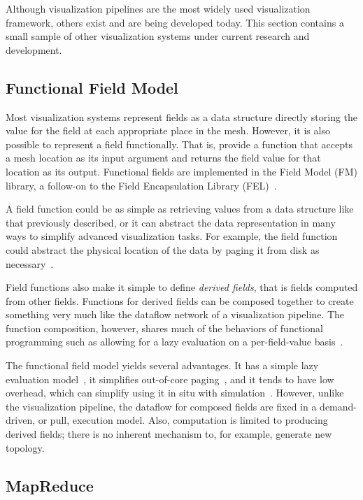 \documentclass[journal,twocolumn,10pt,letterpaper,twoside]{IEEEtran}
\newcommand*{\lcite}[1]{~\cite{#1}}
\newcommand*{\keyterm}[1]{\emph{#1}}
\begin{document}
Although visualization pipelines are the most widely used visualization
framework, others exist and are being developed today.  This section
contains a small sample of other visualization systems under current
research and development.

\subsection{Functional Field Model}
\label{sec:FunctionalFieldModel}

Most visualization systems represent fields as a data structure directly
storing the value for the field at each appropriate place in the mesh.
However, it is also possible to represent a field functionally.  That is,
provide a function that accepts a mesh location as its input argument and
returns the field value for that location as its output.  Functional fields
are implemented in the Field Model (FM) library, a follow-on to the Field
Encapsulation Library (FEL)\lcite{FELPaper}.

A field function could be as simple as retrieving values from a data
structure like that previously described, or it can abstract the data
representation in many ways to simplify advanced visualization tasks.  For
example, the field function could abstract the physical location of the
data by paging it from disk as necessary\lcite{Cox1997}.

Field functions also make it simple to define \keyterm{derived fields},
that is fields computed from other fields.  Functions for derived fields
can be composed together to create something very much like the dataflow
network of a visualization pipeline.  The function composition, however,
shares much of the behaviors of functional programming such as allowing for
a lazy evaluation on a per-field-value basis\lcite{Moran1999}.

The functional field model yields several advantages.  It has a simple lazy
evaluation model\lcite{Moran1999}, it simplifies out-of-core
paging\lcite{Cox1997}, and it tends to have low overhead, which can
simplify using it in situ with simulation\lcite{Ellsworth2006}.  However,
unlike the visualization pipeline, the dataflow for composed fields are
fixed in a demand-driven, or pull, execution model.  Also, computation is
limited to producing derived fields; there is no inherent mechanism to, for
example, generate new topology.

\subsection{MapReduce}
\label{sec:MapReduce}
\end{document}
